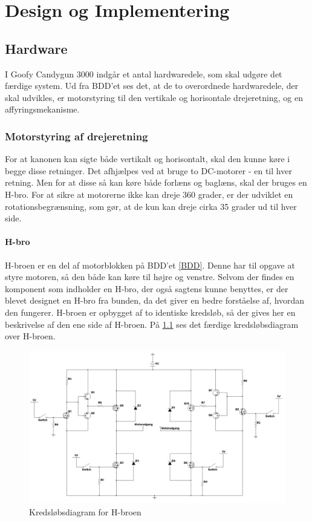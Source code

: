 \chapter{Design og Implementering}

\section{Hardware}
I Goofy Candygun 3000 indgår et antal hardwaredele, som skal udgøre det færdige system. Ud fra BDD'et ses det, at de to overordnede hardwaredele, der skal udvikles, er motorstyring til den vertikale og horisontale drejeretning, og en affyringsmekanisme. 

\subsection{Motorstyring af drejeretning}
For at kanonen kan sigte både vertikalt og horisontalt, skal den kunne køre i begge disse retninger. Det afhjælpes ved at bruge to DC-motorer - en til hver retning. Men for at disse så kan køre både forlæns og baglæns, skal der bruges en H-bro. For at sikre at motorerne ikke kan dreje 360 grader, er der udviklet en rotationsbegrænsning, som gør, at de kun kan dreje cirka 35 grader ud til hver side. 

\subsubsection{H-bro}
H-broen er en del af motorblokken på BDD'et \ref{BDD}. Denne har til opgave at styre motoren, så den både kan køre til højre og venstre. Selvom der findes en komponent som indholder en H-bro, der også sagtens kunne benyttes, er der blevet designet en H-bro fra bunden, da det giver en bedre forståelse af, hvordan den fungerer. H-broen er opbygget af to identiske kredsløb, så der gives her en beskrivelse af den ene side af H-broen. På \ref{fig:hbro} ses det færdige kredsløbsdiagram over H-broen. 

\begin{figure}[H]
		\centering
		\includegraphics[width=\textwidth]{Afsnit/DesignOgImplementering/images/H-bro}
		\caption{Kredsløbsdiagram for H-broen}
		\label{fig:hbro}
\end{figure}

